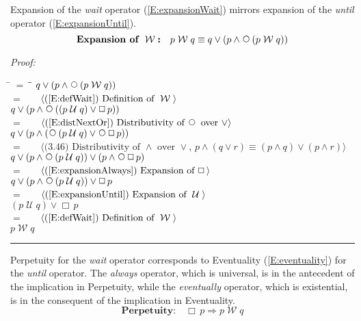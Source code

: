 \documentclass[fleqn, leqno]{article}
\newcommand{\lgap}{2pt}                             %
\newcommand{\mymathindent}{24pt}                    %
\newcommand{\Until}{\;\mathcal{U}\;}
\newcommand{\Wait}{\;\mathcal{W}\;}
\newcommand{\Next}{\;\,\text{\raisebox{3.5pt}{\circle{6}}}}
\newcommand{\Always}{\Box\,}
\newcommand{\myqed}{\rule[-.23ex]{1.2ex}{2.0ex}}
\newcommand{\myqedtab}{\hspace{388.5pt}}              %
\newcommand{\Gll} {\langle}                         %
\newcommand{\Ggg} {\rangle}                         %
\newcommand{\Hint}[1]     {\ \ \ $\Gll              \mbox{#1} \Ggg$ }   %
\begin{document}
Expansion of the \textit{wait} operator (\ref{E:expansionWait}) mirrors expansion of the \textit{until} operator (\ref{E:expansionUntil}).
\begin{equation}\label{E:expansionWait}
\textbf{Expansion of $\Wait$:}\quad p \Wait q \equiv q \lor (p \land \Next (p \Wait q))
\end{equation}

\emph{Proof:}
\begin{tabbing}
\hspace{\mymathindent} \= $= \;$ \= \myqedtab \= \kill
\> \> $q \lor (p \land \Next (p \Wait q))$\\[\lgap]
\> $=$ \> \Hint{(\ref{E:defWait}) Definition of $\Wait$} \\[\lgap]
\> \> $q \lor (p \land \Next ((p \Until q) \lor \Always p))$\\[\lgap]
\> $=$ \> \Hint{(\ref{E:distNextOr}) Distributivity of $\Next$ over $\lor$} \\[\lgap]
\> \> $q \lor (p \land (\Next (p \Until q) \lor \Next\Always p))$\\[\lgap]
\> $=$ \> \Hint{(3.46) Distributivity of $\land$ over $\lor$, $p\land (q\lor r)\equiv (p\land q)\lor (p\land r)$}\\[\lgap]
\> \> $q \lor (p \land \Next(p \Until q)) \lor (p \land \Next\Always p)$\\[\lgap]
\> $=$ \> \Hint{(\ref{E:expansionAlways}) Expansion of $\Always$}\\[\lgap]
\> \> $q \lor (p \land \Next(p \Until q)) \lor \Always p$\\[\lgap]
\> $=$ \> \Hint{(\ref{E:expansionUntil}) Expansion of $\Until$}\\[\lgap]
\> \> $(p \Until q) \lor \Always p$\\[\lgap]
\> $=$ \> \Hint{(\ref{E:defWait}) Definition of $\Wait$} \\[\lgap]
\> \> $p \Wait q$ \> \myqed
\end{tabbing}

Perpetuity for the \textit{wait} operator corresponds to Eventuality (\ref{E:eventuality})
for the \textit{until} operator.
The \textit{always} operator, which is universal, is in the antecedent of the implication in Perpetuity, while
the \textit{eventually} operator, which is existential, is in the consequent of the implication in Eventuality.
\begin{equation}\label{E:alwaysImpWait}
\textbf{Perpetuity:}\quad \Always p \Rightarrow p \Wait q
\end{equation}
\end{document}
